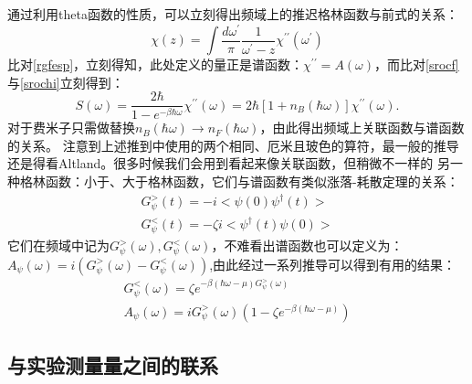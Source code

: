 \documentclass[10pt,openany]{book}
\theoremstyle{thmstyle} %
\theoremstyle{defstyle} %
\theoremstyle{prostyle} %
\begin{document}
通过利用theta函数的性质，可以立刻得出频域上的推迟格林函数与前式的关系：
\begin{equation}
  \chi(z)=\int \frac{d \omega^{\prime}}{\pi} \frac{1}{\omega^{\prime}-z} \chi^{\prime \prime}\left(\omega^{\prime}\right)
  \label{chirelation}
\end{equation}
比对\eqref{rgfesp}，立刻得知，此处定义的量正是谱函数：$ \chi^{\prime \prime}=A(\omega) $，而比对\eqref{srocf}与\eqref{srochi}立刻得到：
\begin{equation}
  S(\omega)=\frac{2 \hbar}{1-e^{-\beta \hbar \omega}} \chi^{\prime \prime}(\omega)=2 \hbar\left[1+n_B(\hbar \omega)\right] \chi^{\prime \prime}(\omega) .
  \label{cfandsf}
\end{equation} 
对于费米子只需做替换$ n_B(\hbar \omega)\to n_F(\hbar \omega) $，由此得出频域上关联函数与谱函数的关系。
注意到上述推到中使用的两个相同、厄米且玻色的算符，最一般的推导还是得看Altland。很多时候我们会用到看起来像关联函数，但稍微不一样的
另一种格林函数：小于、大于格林函数，它们与谱函数有类似涨落-耗散定理的关系：
\begin{equation}
	\begin{aligned}
		G^>_{\psi}(t)=-i<\psi(0)\psi^\dagger(t)>\\
		G^<_{\psi}(t)=-\zeta i<\psi^\dagger(t)\psi(0)>
	\end{aligned}
\end{equation}
它们在频域中记为$ G^>_{\psi}(\omega),G^<_{\psi}(\omega) $，不难看出谱函数也可以定义为：$ A_\psi(\omega)=i(G^>_{\psi}(\omega)-G^<_{\psi}(\omega)) $,由此经过一系列推导可以得到有用的结果：
\begin{equation}
	\begin{aligned}
		G^<_{\psi}(\omega)=\zeta e^{-\beta(\hbar\omega-\mu)G^>_{\psi}(\omega)}\\
		A_\psi(\omega)=iG^>_{\psi}(\omega)(1-\zeta e^{-\beta(\hbar\omega-\mu)})
	\end{aligned}
	\label{landgsf}
\end{equation} 
\subsection{与实验测量量之间的联系}
\end{document}
